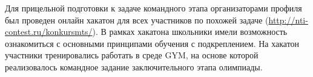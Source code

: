 Для прицельной подготовки к задаче командного этапа организаторами профиля был проведен онлайн хакатон для всех участников по похожей задаче (\url{http://nti-contest.ru/konkursmts/}). В рамках хакатона школьники имели возможность ознакомиться с основными принципами обучения с подкреплением. На хакатон участники тренировались работать в среде GYM, на основе которой реализовалось командное задание заключительного этапа олимпиады. 

\clearpage
\endgroup